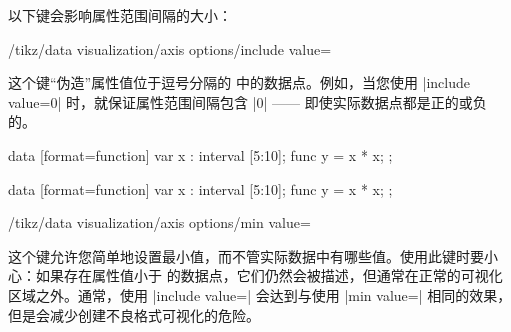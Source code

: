 以下键会影响属性范围间隔的大小：
%
\begin{key}{/tikz/data visualization/axis options/include value=} %

    这个键``伪造''属性值位于逗号分隔的  中的数据点。例如，当您使用 |include value=0| 时，就保证属性范围间隔包含 |0| —— 即使实际数据点都是正的或负的。
    
\begin{codeexample}[preamble={\usetikzlibrary{datavisualization.formats.functions}}]
\tikz \datavisualization [scientific axes, all axes={length=3cm},
                          visualize as line]
  data [format=function] {
    var x : interval [5:10];
    func y = \value x * \value x;
  };
\end{codeexample}
\begin{codeexample}[preamble={\usetikzlibrary{datavisualization.formats.functions}}]
\tikz \datavisualization [scientific axes, all axes={length=3cm},
                          visualize as line,
                          x axis={include value=20},
                          y axis={include value=0}]
  data [format=function] {
    var x : interval [5:10];
    func y = \value x * \value x;
  };
\end{codeexample}
\end{key}

\begin{key}{/tikz/data visualization/axis options/min value=} %

    这个键允许您简单地设置最小值，而不管实际数据中有哪些值。使用此键时要小心：如果存在属性值小于  的数据点，它们仍然会被描述，但通常在正常的可视化区域之外。通常，使用 |include value=| 会达到与使用 |min value=| 相同的效果，但是会减少创建不良格式可视化的危险。
\end{key}

